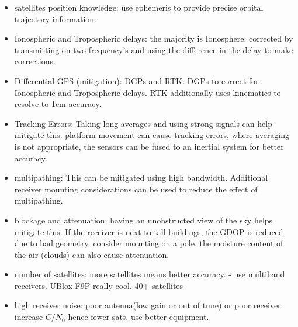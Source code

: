 \documentclass[11pt]{article}
\begin{document}
\begin{itemize}
    \item satellites position knowledge: use ephemeris to provide precise orbital trajectory information.
    \item Ionospheric and Tropospheric delays: the majority is Ionosphere: corrected by transmitting on two frequency's and using the difference in the delay to make corrections.
    \item Differential GPS (mitigation): DGPs and RTK: DGPs to correct for Ionospheric and Tropospheric delays. RTK additionally uses kinematics to resolve to 1cm accuracy.
    \item Tracking Errors: Taking long averages and using strong signals can help mitigate this. platform movement can cause tracking errors, where averaging is not appropriate, the sensors can be fused to an inertial system for better accuracy.
    \item multipathing: This can be mitigated using high bandwidth. Additional receiver mounting considerations can be used to reduce the effect of multipathing.
    \item blockage and attenuation:  having an unobstructed view of the sky helps mitigate this. If the receiver is next to tall buildings, the GDOP is reduced due to bad geometry. consider mounting on a pole. the moisture content of the air (clouds) can also cause attenuation. 
    \item number of satellites: more satellites means better accuracy. - use multiband receivers. UBlox F9P really cool. 40+ satellites
    \item high receiver noise: poor antenna(low gain or out of tune) or poor receiver: increase $C/N_0$ hence fewer sats. use better equipment.
\end{itemize}





\pagebreak



\end{document}

